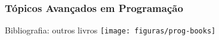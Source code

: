 \begin{frame}
 \frametitle{Tópicos Avançados em Programação}
 \begin{block}{Bibliografia: outros livros}
  \centering
  \texttt{[image: figuras/prog-books]}
 \end{block}
\end{frame}

